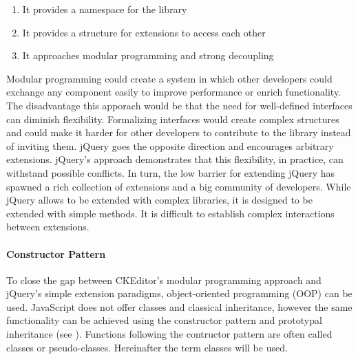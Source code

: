 \begin{enumerate}
\item It provides a namespace for the library
\item It provides a structure for extensions to access each other
\item It approaches modular programming and strong decoupling
\end{enumerate}

Modular programming could create a system in which other developers could exchange any component easily to improve performance or enrich functionality. The disadvantage this apporach would be that the need for well-defined interfaces can diminish flexibility. Formalizing interfaces would create complex structures and could make it harder for other developers to contribute to the library instead of inviting them. jQuery goes the opposite direction and encourages arbitrary extensions. jQuery's approach demonstrates that this flexibility, in practice, can withstand possible conflicts. In turn, the low barrier for extending jQuery has spawned a rich collection of extensions and a big community of developers. While jQuery allows to be extended with complex libraries, it is designed to be extended with simple methods. It is difficult to establish complex interactions between extensions.



\paragraph{Constructor Pattern} To close the gap between CKEditor's modular programming approach and jQuery's simple extension paradigms, object-oriented programming (OOP) can be used. JavaScript does not offer classes and classical inheritance, however the same functionality can be achieved using the constructor pattern and prototypal inheritance (see ). Functions following the contructor pattern are often called classes or pseudo-classes. Hereinafter the term classes will be used.

%
%
%

